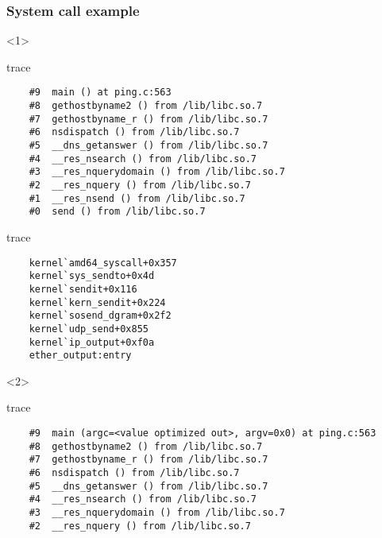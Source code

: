 \documentclass{beamer}
\begin{document}
\begin{frame}[fragile]
\frametitle{System call example}
\begin{scriptsize}
\begin{onlyenv}<1>
  \begin{beamercolorbox}[rounded=true,shadow=true,sep=0pt,ht=3.5cm]{trace}
	\begin{verbatim}
	#9  main () at ping.c:563
	#8  gethostbyname2 () from /lib/libc.so.7
	#7  gethostbyname_r () from /lib/libc.so.7
	#6  nsdispatch () from /lib/libc.so.7
	#5  __dns_getanswer () from /lib/libc.so.7
	#4  __res_nsearch () from /lib/libc.so.7
	#3  __res_nquerydomain () from /lib/libc.so.7
	#2  __res_nquery () from /lib/libc.so.7
	#1  __res_nsend () from /lib/libc.so.7
	#0  send () from /lib/libc.so.7
	\end{verbatim}
  \end{beamercolorbox}
  \begin{beamercolorbox}[rounded=true,shadow=true,sep=0pt,ht=3cm]{trace}
	\begin{verbatim}
	kernel`amd64_syscall+0x357
	kernel`sys_sendto+0x4d
	kernel`sendit+0x116
	kernel`kern_sendit+0x224
	kernel`sosend_dgram+0x2f2
	kernel`udp_send+0x855
	kernel`ip_output+0xf0a
	ether_output:entry 
	\end{verbatim}
  \end{beamercolorbox}
\end{onlyenv}
\begin{onlyenv}<2>
  \begin{beamercolorbox}[rounded=true,shadow=true,sep=0pt,ht=3.5cm]{trace}
	\begin{verbatim}
	#9  main (argc=<value optimized out>, argv=0x0) at ping.c:563
	#8  gethostbyname2 () from /lib/libc.so.7
	#7  gethostbyname_r () from /lib/libc.so.7
	#6  nsdispatch () from /lib/libc.so.7
	#5  __dns_getanswer () from /lib/libc.so.7
	#4  __res_nsearch () from /lib/libc.so.7
	#3  __res_nquerydomain () from /lib/libc.so.7
	#2  __res_nquery () from /lib/libc.so.7

\end{verbatim}
\end{beamercolorbox}
\end{onlyenv}
\end{scriptsize}
\end{frame}
\end{document}
